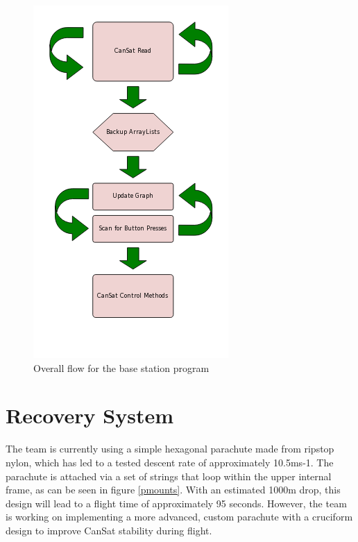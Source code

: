 \documentclass[]{report}
\begin{document}
\begin{figure}[h]
	\hfill\includegraphics[scale=0.7]{Base-Station-program-flow.png}\hspace*{\fill}
	\caption{Overall flow for the base station program}
	\label{bflow}
\end{figure}

\section{Recovery System}
The team is currently using a simple hexagonal parachute made from ripstop nylon, which has led to a tested descent rate of approximately 10.5ms-1. The parachute is attached via a set of strings that loop within the upper internal frame, as can be seen in figure \ref{pmounts}.
With an estimated 1000m drop, this design will lead to a flight time of approximately 95 seconds. However, the team is working on implementing a more advanced, custom parachute with a cruciform design to improve CanSat stability during flight.
\end{document}
